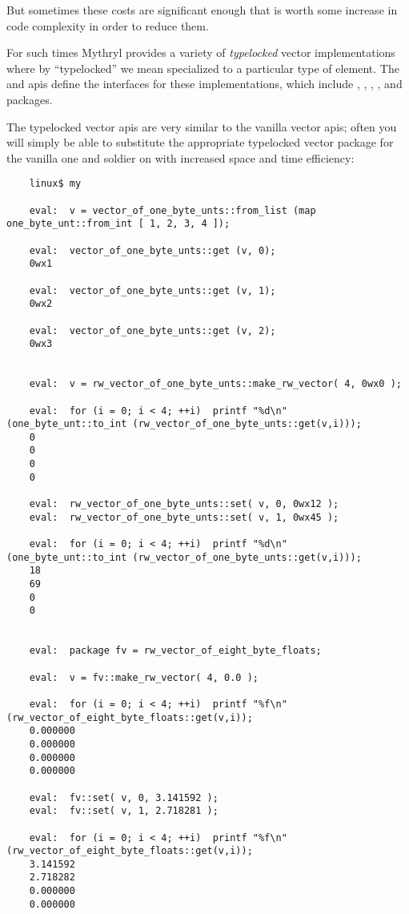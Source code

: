 But sometimes these costs are significant enough that is worth some increase in code 
complexity in order to reduce them.

For such times Mythryl provides a variety of {\it typelocked} vector implementations 
where by ``typelocked'' we mean specialized to a particular type of element. 
The  and 
  apis define the 
interfaces for these implementations, which include 
,
,
,
,
 and 
 packages.

The typelocked vector apis are very similar to the vanilla vector apis;  often 
you will simply be able to substitute the appropriate typelocked vector package 
for the vanilla one and soldier on with increased space and time efficiency:

\begin{verbatim}
    linux$ my

    eval:  v = vector_of_one_byte_unts::from_list (map one_byte_unt::from_int [ 1, 2, 3, 4 ]);

    eval:  vector_of_one_byte_unts::get (v, 0);
    0wx1

    eval:  vector_of_one_byte_unts::get (v, 1);
    0wx2

    eval:  vector_of_one_byte_unts::get (v, 2);
    0wx3


    eval:  v = rw_vector_of_one_byte_unts::make_rw_vector( 4, 0wx0 );

    eval:  for (i = 0; i < 4; ++i)  printf "%d\n" (one_byte_unt::to_int (rw_vector_of_one_byte_unts::get(v,i)));
    0
    0
    0
    0

    eval:  rw_vector_of_one_byte_unts::set( v, 0, 0wx12 );
    eval:  rw_vector_of_one_byte_unts::set( v, 1, 0wx45 );

    eval:  for (i = 0; i < 4; ++i)  printf "%d\n" (one_byte_unt::to_int (rw_vector_of_one_byte_unts::get(v,i)));
    18
    69
    0
    0


    eval:  package fv = rw_vector_of_eight_byte_floats;

    eval:  v = fv::make_rw_vector( 4, 0.0 );

    eval:  for (i = 0; i < 4; ++i)  printf "%f\n" (rw_vector_of_eight_byte_floats::get(v,i));
    0.000000
    0.000000
    0.000000
    0.000000

    eval:  fv::set( v, 0, 3.141592 );
    eval:  fv::set( v, 1, 2.718281 );

    eval:  for (i = 0; i < 4; ++i)  printf "%f\n" (rw_vector_of_eight_byte_floats::get(v,i));
    3.141592
    2.718282
    0.000000
    0.000000
\end{verbatim}




